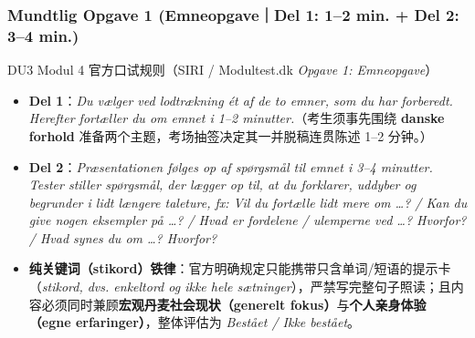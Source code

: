 
\subsubsection*{Mundtlig Opgave 1 (Emneopgave｜Del 1: 1--2 min. + Del 2: 3--4 min.)}

\begin{tipbox}{DU3 Modul 4 官方口试规则（SIRI / Modultest.dk \textit{Opgave 1: Emneopgave}）}
\small
\begin{itemize}
  \item \textbf{Del 1}：\textit{Du vælger ved lodtrækning ét af de to emner, som du har forberedt. Herefter fortæller du om emnet i 1--2 minutter.}（考生须事先围绕 \textbf{danske forhold} 准备两个主题，考场抽签决定其一并脱稿连贯陈述 1--2 分钟。）
  \item \textbf{Del 2}：\textit{Præsentationen følges op af spørgsmål til emnet i 3--4 minutter. Tester stiller spørgsmål, der lægger op til, at du forklarer, uddyber og begrunder i lidt længere taleture, fx: Vil du fortælle lidt mere om …? / Kan du give nogen eksempler på …? / Hvad er fordelene / ulemperne ved …? Hvorfor? / Hvad synes du om …? Hvorfor?}
  \item \textbf{纯关键词（stikord）铁律}：官方明确规定只能携带只含单词/短语的提示卡（\textit{stikord, dvs. enkeltord og ikke hele sætninger}），严禁写完整句子照读；且内容必须同时兼顾\textbf{宏观丹麦社会现状（generelt fokus）}与\textbf{个人亲身体验（egne erfaringer）}，整体评估为 \textit{Bestået / Ikke bestået}。
\end{itemize}
\end{tipbox}

